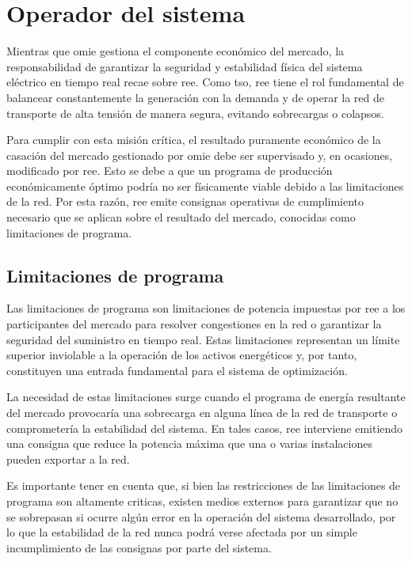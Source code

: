 \section{Operador del sistema}
\label{makereference4.2}

Mientras que \gls{omie} gestiona el componente económico del mercado, la responsabilidad de garantizar la seguridad y estabilidad física del sistema eléctrico en tiempo real recae sobre \gls{ree}. Como \gls{tso}, \gls{ree} tiene el rol fundamental de balancear constantemente la generación con la demanda y de operar la red de transporte de alta tensión de manera segura, evitando sobrecargas o colapsos.

Para cumplir con esta misión crítica, el resultado puramente económico de la casación del mercado gestionado por \gls{omie} debe ser supervisado y, en ocasiones, modificado por \gls{ree}. Esto se debe a que un programa de producción económicamente óptimo podría no ser físicamente viable debido a las limitaciones de la red. Por esta razón, \gls{ree} emite consignas operativas de cumplimiento necesario que se aplican sobre el resultado del mercado, conocidas como limitaciones de programa.

\subsection{Limitaciones de programa}
\label{makereference4.2.1}

Las limitaciones de programa son limitaciones de potencia impuestas por \gls{ree} a los participantes del mercado para resolver congestiones en la red o garantizar la seguridad del suministro en tiempo real. Estas limitaciones representan un límite superior inviolable a la operación de los activos energéticos y, por tanto, constituyen una entrada fundamental para el sistema de optimización.

La necesidad de estas limitaciones surge cuando el programa de energía resultante del mercado provocaría una sobrecarga en alguna línea de la red de transporte o comprometería la estabilidad del sistema. En tales casos, \gls{ree} interviene emitiendo una consigna que reduce la potencia máxima que una o varias instalaciones pueden exportar a la red.

Es importante tener en cuenta que, si bien las restricciones de las limitaciones de programa son altamente criticas, existen medios externos para garantizar que no se sobrepasan si ocurre algún error en la operación del sistema desarrollado, por lo que la estabilidad de la red nunca podrá verse afectada por un simple incumplimiento de las consignas por parte del sistema.

